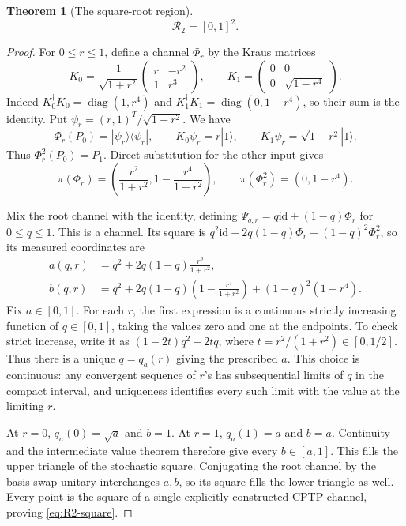\documentclass[11pt]{article}
\newtheorem{theorem}{Theorem}[section]
\theoremstyle{definition}
\theoremstyle{remark}
\DeclareMathOperator{\diag}{diag}
\newcommand{\id}{\mathrm{id}}
\begin{document}
\begin{theorem}[The square-root region]\label{thm:square-roots}
\begin{equation}\label{eq:R2-square}
 \mathcal R_2=[0,1]^2.
\end{equation}
\end{theorem}
\begin{proof}
For \(0\leq r\leq1\), define a channel \(\Phi_r\) by the Kraus matrices
\begin{equation}\label{eq:root-kraus}
 K_0=\frac1{\sqrt{1+r^2}}
 \begin{pmatrix}r&-r^2\\1&r^3\end{pmatrix},\qquad
 K_1=\begin{pmatrix}0&0\\0&\sqrt{1-r^4}\end{pmatrix}.
\end{equation}
Indeed \(K_0^\dagger K_0=\diag(1,r^4)\) and \(K_1^\dagger K_1=\diag(0,1-r^4)\), so their sum is the identity. Put
\(\psi_r=(r,1)^T/\sqrt{1+r^2}\). We have
\[
 \Phi_r(P_0)=|\psi_r\rangle\langle\psi_r|,\qquad
 K_0\psi_r=r|1\rangle,\qquad K_1\psi_r=\sqrt{1-r^2}|1\rangle.
\]
Thus \(\Phi_r^2(P_0)=P_1\). Direct substitution for the other input gives
\begin{equation}\label{eq:root-readouts}
 \pi(\Phi_r)=\left(\frac{r^2}{1+r^2},1-\frac{r^4}{1+r^2}\right),\qquad
 \pi(\Phi_r^2)=(0,1-r^4).
\end{equation}

Mix the root channel with the identity, defining
\(\Psi_{q,r}=q\id+(1-q)\Phi_r\) for \(0\leq q\leq1\). This is a channel. Its square is
\(q^2\id+2q(1-q)\Phi_r+(1-q)^2\Phi_r^2\), so its measured coordinates are
\begin{equation}\label{eq:root-square-formula}
 \begin{aligned}
 a(q,r)&=q^2+2q(1-q)\frac{r^2}{1+r^2},\\
 b(q,r)&=q^2+2q(1-q)\left(1-\frac{r^4}{1+r^2}\right)
            +(1-q)^2(1-r^4).
 \end{aligned}
\end{equation}
Fix \(a\in[0,1]\). For each \(r\), the first expression is a continuous strictly increasing function of \(q\in[0,1]\), taking the values zero and one at the endpoints. To check strict increase, write it as \((1-2t)q^2+2tq\), where \(t=r^2/(1+r^2)\in[0,1/2]\). Thus there is a unique \(q=q_a(r)\) giving the prescribed \(a\). This choice is continuous: any convergent sequence of \(r\)'s has subsequential limits of \(q\) in the compact interval, and uniqueness identifies every such limit with the value at the limiting \(r\).

At \(r=0\), \(q_a(0)=\sqrt a\) and \(b=1\). At \(r=1\), \(q_a(1)=a\) and \(b=a\). Continuity and the intermediate value theorem therefore give every \(b\in[a,1]\). This fills the upper triangle of the stochastic square. Conjugating the root channel by the basis-swap unitary interchanges \(a,b\), so its square fills the lower triangle as well. Every point is the square of a single explicitly constructed CPTP channel, proving \eqref{eq:R2-square}.
\end{proof}
\end{document}
